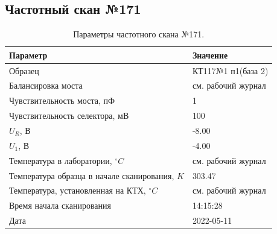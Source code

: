 \subsection{Частотный скан №171}
\begin{table}[!ht]
    \centering
    \caption{Параметры частотного скана №171.}
    \begin{tabular}{|l|l|}
        \hline
        Параметр                                       & Значение                  \\ \hline
        Образец                                        & КТ117№1 п1(база 2)        \\ \hline
        Балансировка моста                             & см. рабочий журнал        \\ \hline
        Чувствительность моста, пФ                     & 1                         \\ \hline
        Чувствительность селектора, мВ                 & 100                       \\ \hline
        $U_R$, В                                       & -8.00                     \\ \hline
        $U_1$, В                                       & -4.00                     \\ \hline
        Температура в лаборатории, $^\circ C$          & см. рабочий журнал        \\ \hline
        Температура образца в начале сканирования, $K$ & 303.47                    \\ \hline
        Температура, установленная на КТХ, $^\circ C$  & см. рабочий журнал        \\ \hline
        Время начала сканирования                      & 14:15:28                  \\ \hline
        Дата                                           & 2022-05-11                \\ \hline
    \end{tabular}
    \label{table:frequency_scan_171}
\end{table}

